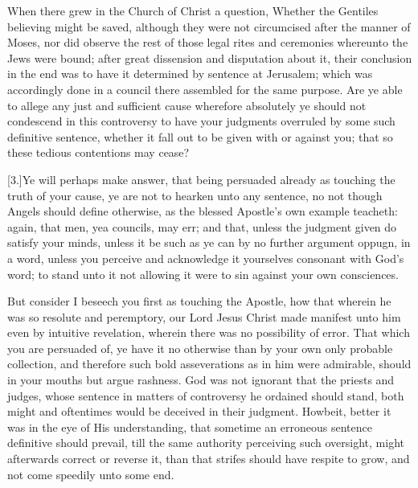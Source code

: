 When there grew in the Church of Christ a question, Whether the Gentiles believing might be saved, although they were not circumcised after the manner of Moses, nor did observe the rest of those legal rites and ceremonies whereunto the Jews were bound; after great dissension and disputation about it, their conclusion in the end was to have it determined by sentence at Jerusalem; which was accordingly done in a council there assembled for the same purpose. Are ye able to allege any just and sufficient cause wherefore absolutely ye should not condescend in this controversy to have your judgments overruled by some such definitive sentence, whether it fall out to be given with or against you; that so these tedious contentions may cease?

[3.]Ye will perhaps make answer, that being persuaded already as touching the truth of your cause, ye are not to hearken unto any sentence, no not though Angels should define otherwise, as the blessed Apostle’s own example teacheth: again, that men, yea councils, may err; and that, unless the judgment given do satisfy your minds, unless it be such as ye can by no further argument oppugn, in a word, unless you perceive and acknowledge it yourselves consonant with God’s word; to stand unto it not allowing it were to sin against your own consciences.

But consider I beseech you first as touching the Apostle, how that wherein he was so resolute and peremptory, our Lord Jesus Christ made manifest unto him even by intuitive revelation, wherein there was no possibility of error. That which you are persuaded of, ye have it no otherwise than by your own only probable collection, and therefore such bold asseverations as in him were admirable, should in your mouths but argue rashness. God was not ignorant that the priests and judges, whose sentence in matters of controversy he ordained should stand, both might and oftentimes would be deceived in their judgment. Howbeit, better it was in the eye of His understanding, that sometime an erroneous sentence definitive should prevail, till the same authority perceiving such oversight, might afterwards correct or reverse it, than that strifes should have respite to grow, and not come speedily unto some end.

